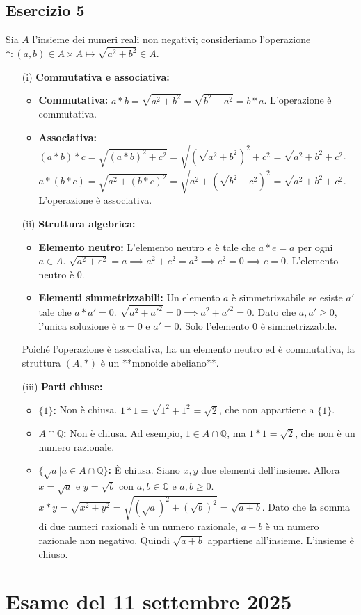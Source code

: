 \subsection*{Esercizio 5}
Sia $A$ l'insieme dei numeri reali non negativi; consideriamo l'operazione $*:(a,b)\in A\times A\mapsto\sqrt{a^{2}+b^{2}}\in A$.
\begin{itemize}
    \item[(i)] \textbf{Commutativa e associativa:}
    \begin{itemize}
        \item \textbf{Commutativa:} $a*b = \sqrt{a^2+b^2} = \sqrt{b^2+a^2} = b*a$. L'operazione è commutativa.
        \item \textbf{Associativa:} $(a*b)*c = \sqrt{(a*b)^2+c^2} = \sqrt{(\sqrt{a^2+b^2})^2+c^2} = \sqrt{a^2+b^2+c^2}$.
        $a*(b*c) = \sqrt{a^2+(b*c)^2} = \sqrt{a^2+(\sqrt{b^2+c^2})^2} = \sqrt{a^2+b^2+c^2}$.
        L'operazione è associativa.
    \end{itemize}
    \item[(ii)] \textbf{Struttura algebrica:}
    \begin{itemize}
        \item \textbf{Elemento neutro:} L'elemento neutro $e$ è tale che $a*e = a$ per ogni $a\in A$.
        $\sqrt{a^2+e^2}=a \implies a^2+e^2=a^2 \implies e^2=0 \implies e=0$. L'elemento neutro è $0$.
        \item \textbf{Elementi simmetrizzabili:} Un elemento $a$ è simmetrizzabile se esiste $a'$ tale che $a*a'=0$.
        $\sqrt{a^2+a'^2}=0 \implies a^2+a'^2=0$. Dato che $a,a' \ge 0$, l'unica soluzione è $a=0$ e $a'=0$.
        Solo l'elemento $0$ è simmetrizzabile.
    \end{itemize}
    Poiché l'operazione è associativa, ha un elemento neutro ed è commutativa, la struttura $(A, *)$ è un **monoide abeliano**.

    \item[(iii)] \textbf{Parti chiuse:}
    \begin{itemize}
        \item \textbf{$\{1\}$:} Non è chiusa. $1*1 = \sqrt{1^2+1^2} = \sqrt{2}$, che non appartiene a $\{1\}$.
        \item \textbf{$A\cap\mathbb{Q}$:} Non è chiusa. Ad esempio, $1\in A\cap\mathbb{Q}$, ma $1*1=\sqrt{2}$, che non è un numero razionale.
        \item \textbf{$\{\sqrt{a}|a\in A\cap\mathbb{Q}\}$:} È chiusa. Siano $x,y$ due elementi dell'insieme. Allora $x=\sqrt{a}$ e $y=\sqrt{b}$ con $a,b\in\mathbb{Q}$ e $a,b\ge 0$.
        $x*y=\sqrt{x^2+y^2}=\sqrt{(\sqrt{a})^2+(\sqrt{b})^2}=\sqrt{a+b}$.
        Dato che la somma di due numeri razionali è un numero razionale, $a+b$ è un numero razionale non negativo. Quindi $\sqrt{a+b}$ appartiene all'insieme. L'insieme è chiuso.
    \end{itemize}
\end{itemize}

\section{Esame del 11 settembre 2025}